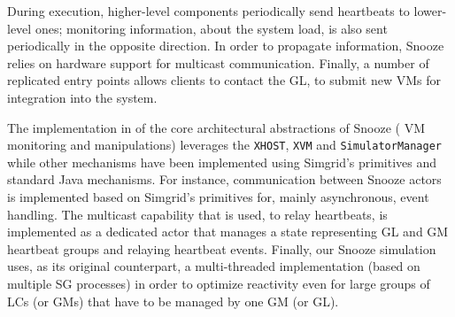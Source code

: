 During execution, higher-level components periodically send heartbeats
to lower-level ones; monitoring information, \eg about the system
load, is also sent periodically in the opposite direction. In order to
propagate information, Snooze relies on hardware support for multicast
communication. Finally, a number of replicated entry points allows
clients to contact the GL, \eg to submit new VMs for
integration into the system.

The implementation in \vmps of the core architectural abstractions of Snooze  (\ie
VM monitoring and manipulations) leverages the \texttt{XHOST}, \texttt{XVM} and
\texttt{SimulatorManager} while other mechanisms have been implemented
using Simgrid's primitives and standard Java mechanisms.
%
For instance, communication between Snooze actors is implemented based on Simgrid's
primitives for, mainly asynchronous, event handling.
The multicast capability that is used, \eg
to relay heartbeats, is implemented as a dedicated actor that manages
a state representing GL and GM heartbeat groups and relaying heartbeat
events.
%
Finally, our Snooze simulation uses, as its original counterpart, a
multi-threaded implementation (\ie based on multiple SG processes) in
order to optimize reactivity even for large groups of LCs (or GMs)
that have to be managed by one GM (or GL).





